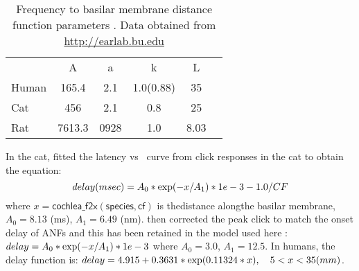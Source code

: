 \begin{table}[ht]
  \centering
  \begin{tabular}{lccccc}
    \hline
    &   A   &   a  &     k     & L \\
    Human & 165.4 &  2.1 & 1.0(0.88) & 35\\
    Cat  &  456  &  2.1 &    0.8    & 25 \\
    Rat  & 7613.3& 0928 &    1.0    & 8.03 \\
    \hline
  \end{tabular}
  \caption[Basilar membrane frequency-distance function parameters]{Frequency to basilar membrane distance function parameters \citep{FitzGeraldBurkittEtAl:2001}. Data obtained from \url{http://earlab.bu.edu} \label{tab:f2x}}
\end{table}

In the cat, \citet{CarneyYin:1988} fitted the latency vs \CF~curve from click
responses in the cat to obtain the equation:
\begin{equation}
  \label{eq:delay}
   delay (msec) = A_0 * {\rm exp}(-x / A_1 ) * 1e-3 - 1.0/CF
\end{equation}
\noindent where $x = \mathsf{cochlea\_f2x(species, cf)}$ is
thedistance alongthe basilar membrane, $A_0 = 8.13$ (ms), $A_1 = 6.49$
(nm). \citet{HeinzZhangEtAl:2001} then corrected the peak click to match the
onset delay of ANFs and this has been retained in the model used here
\citep{ZilanyBruceEtAl:2009}: \(delay = A_0 * {\rm exp}(-x / A_1) * 1e-3 \)
where $A_0 = 3.0$, $A_1 = 12.5$. In humans, the delay function is: \( delay =
4.915 + 0.3631 * {\rm exp}(0.11324*x),\quad  5<x<35 (mm) \).


